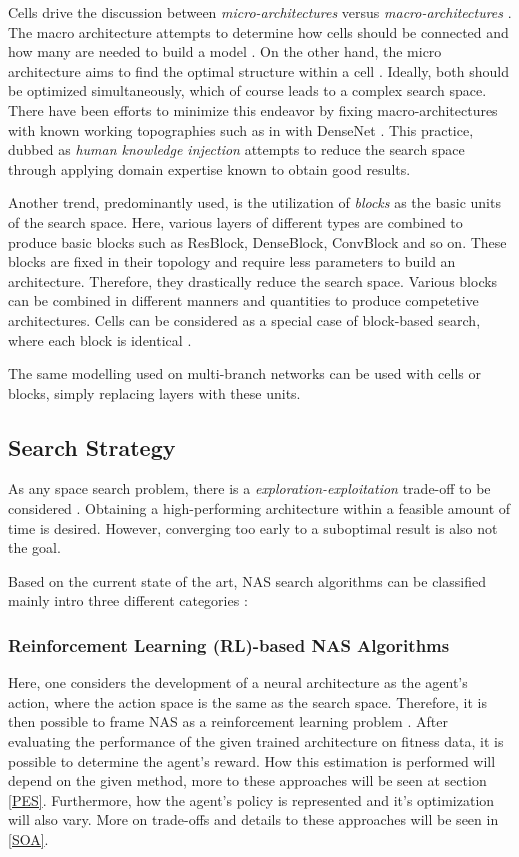 \documentclass[10pt,        %
               a4paper,     %
               journal,     %
               ]{IEEEtran}
\begin{document}
Cells drive the discussion between \textit{micro-architectures} versus \textit{macro-architectures} \cite{elsken2019neural}. The macro architecture
attempts to determine how cells should be connected and how many are needed to build a model \cite{elsken2019neural}. On the other hand, the micro
architecture aims to find the optimal structure within a cell \cite{elsken2019neural}. Ideally, both should be optimized simultaneously, which of course
leads to a complex search space. There have been efforts to minimize this endeavor by fixing macro-architectures with
known working topographies such as in \cite{pmlr-v80-cai18a} with DenseNet \cite{Huang_2017_CVPR}. This practice, dubbed as
\textit{human knowledge injection} attempts to reduce the search space through applying domain expertise known to obtain good
results.

Another trend, predominantly used, is the utilization of \textit{blocks} as the basic units of the search space. Here, various layers of different types
are combined to produce basic blocks such as ResBlock, DenseBlock, ConvBlock and so on. These blocks are fixed in their topology
and require less parameters to build an architecture. Therefore, they drastically reduce the search space. Various blocks can be combined
in different manners and quantities to produce competetive architectures. Cells can be considered as a special case of block-based
search, where each block is identical \cite{liu2021survey}.

The same modelling used on multi-branch networks can be used with cells or blocks, simply replacing layers with
these units.

\subsection{Search Strategy}
As any space search problem, there is a \textit{exploration-exploitation} trade-off to be considered \cite{elsken2019neural}.
Obtaining a high-performing architecture within a feasible amount of time is desired. However, converging too early to a
suboptimal result is also not the goal.

Based on the current state of the art, NAS search algorithms can be classified mainly intro three different
categories \cite{liu2021survey}:

\subsubsection{\textbf{Reinforcement Learning} (RL)-based NAS Algorithms}
Here, one considers the development of a neural architecture as the agent's action, where the action space is the same as
the search space. Therefore, it is then possible to frame NAS as a reinforcement learning problem \cite{elsken2019neural}.
After evaluating the performance of the given trained architecture on fitness data, it is possible to
determine the agent's reward. How this estimation is performed will depend on the given method, more to these
approaches will be seen at section \ref{PES}. Furthermore, how the agent's policy is represented and it's optimization will
also vary. More on trade-offs and details to these approaches will be seen in \ref{SOA}.
\end{document}
